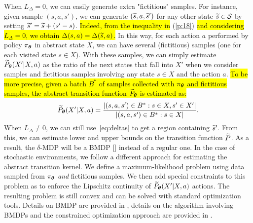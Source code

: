 %
When $L_{\Delta}=0$, we can easily generate extra "fictitious" samples. For instance, given sample $(s,a,s')$, we can generate $(\widetilde{s},a,\widetilde{s}')$ for any other state $\widetilde{s}\in\mathcal{S}$ by setting $\widetilde{s}' = \widetilde{s} + (s'-s)$. \hl{Indeed, from the inequality in} (\ref{p:18}) \hl{and considering $L_{\Delta}=0$, we obtain $\Delta(s,a)=\Delta(\widetilde{s},a)$.} In this way, for each action $a$ performed by policy $\pi_{\boldsymbol{\theta}}$ in abstract state $X$, we can have several (fictitious) samples (one for each visited state $s\in X$). With these samples, we can simply estimate $\widetilde{P}_{\boldsymbol{\theta}}(X'|X,a)$ as the ratio of the next states that fall into $X'$ when we consider samples and fictitious samples involving any state $s \in X$ and the action $a$. \hl{To be more precise, given a batch $B^{*}$ of samples collected with $\pi_{\boldsymbol{\theta}}$ and fictitious samples, the abstract transition function $\widetilde{P}_{\boldsymbol{\theta}}$ is estimated as:}
\begin{align}
	\widetilde{P}_{\boldsymbol{\theta}}(X'|X,a) = \frac{|(s,a,s') \in B^{*}: s \in X, s' \in X'|}{|(s,a,s') \in B^{*}: s \in X|}.
\end{align}
When $L_{\Delta}\neq 0$, we can still use~\eqref{eq:deltas} to get a region containing $\widetilde{s}'$.
From this, we can estimate lower and upper bounds on the transition function $\widetilde{P}$. As a result, the $\delta$-\ac{MDP} will be a \ac{BMDP} [\cite{givan2000bounded}] instead of a regular one.
%
In the case of stochastic environments, we follow a different approach for estimating the abstract transition kernel. We define a maximum-likelihood problem using data sampled from $\pi_{\boldsymbol{\theta}}$ \textit{and} fictitious samples. We then add special constraints to this problem as to enforce the Lipschitz continuity of $\widetilde{P}_{\boldsymbol{\theta}}(X'|X,a)$ \wrt actions. The resulting problem is still convex and can be solved with standard optimization tools.
Details on \ac{BMDP} are provided in , details on the algorithm involving \ac{BMDP}s and the constrained optimization approach are provided in . 

